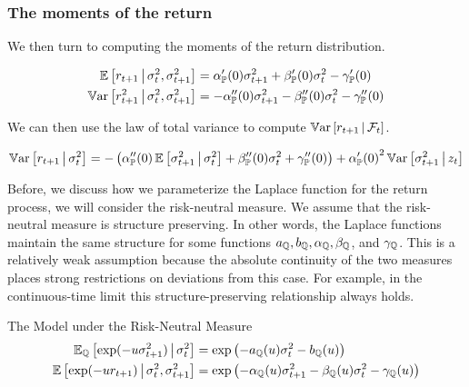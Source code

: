 \documentclass[11pt, letterpaper, twoside, final]{article}
\begin{document}
\subsubsection{The moments of the return}

We then turn to computing the moments of the return distribution. 

\begin{align}
    \operatorname{\mathbb{E}}\left[r_{t+1} \,\middle\vert\, \sigma^2_t, \sigma^2_{t+1}\right]  &= \alpha_{\mathbb{P}}'(0) \sigma^2_{t+1}  + \beta_{\mathbb{P}}'(0)
    \sigma^2_t - \gamma_{\mathbb{P}}'(0) \\
    \operatorname{\mathbb{V}ar}\left[r_{t+1}^2 \,\middle\vert\, \sigma^2_t, \sigma^2_{t+1}\right]  &= -\alpha_{\mathbb{P}}''(0) \sigma^2_{t+1}  -
    \beta_{\mathbb{P}}''(0) \sigma^2_t - \gamma_{\mathbb{P}}''(0)
\end{align}

We can then use the law of total variance to compute $\operatorname{\mathbb{V}ar}\left[r_{t+1} \,\middle\vert\, \mathcal{F}_t\right]$.

\begin{equation}
    \operatorname{\mathbb{V}ar}\left[r_{t+1} \,\middle\vert\, \sigma^2_t\right]  = -\left( \alpha_{\mathbb{P}}''(0) \operatorname{\mathbb{E}} \left[\sigma^2_{t+1} \,\middle\vert\, \sigma^2_t \right]
    + \beta_{\mathbb{P}}''(0) \sigma^2_t + \gamma_{\mathbb{P}}''(0)\right) + {\alpha_{\mathbb{P}}'(0)}^2 \operatorname{\mathbb{V}ar}\left[\sigma^2_{t+1}
    \,\middle\vert\, z_{t} \right]
\end{equation}

Before, we discuss how we parameterize the Laplace function for the return process, we will consider the
risk-neutral measure.
We assume that the risk-neutral measure is structure preserving.
In other words, the Laplace functions maintain the same structure for some functions $a_{\mathbb{Q}}, b_{\mathbb{Q}},
\alpha_{\mathbb{Q}}, \beta_{\mathbb{Q}}$, and $\gamma_{\mathbb{Q}}$.
This is a relatively weak assumption because the absolute continuity of the two measures places strong
restrictions on deviations from this case.
For example, in the continuous-time limit this structure-preserving relationship always holds.

\begin{defn}{The Model under the Risk-Neutral Measure}
    \label{defn:risk_neutral_model}
    \begin{align}
        \operatorname{\mathbb{E}}_{\mathbb{Q}} \left[\exp(-u \sigma^2_{t+1}) \,\middle\vert\, \sigma^2_t\right] &= \exp\left( - a_{\mathbb{Q}}(u)
            \sigma^2_{t} - b_{\mathbb{Q}}(u) \right) \\
        \operatorname{\mathbb{E}}\left[\exp(-u r_{t+1}) \,\middle\vert\, \sigma^2_{t},  \sigma^2_{t+1}\right] &= \exp\left(- \alpha_{\mathbb{Q}}(u)
        \sigma^2_{t+1} - \beta_{\mathbb{Q}}(u)\sigma^2_{t} - \gamma_{\mathbb{Q}}(u) \right) 
    \end{align}
\end{defn}
\end{document}
